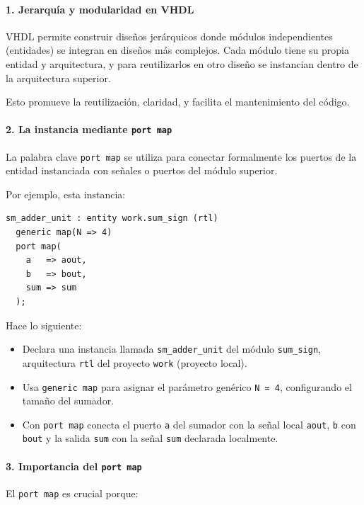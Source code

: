 \documentclass[a4paper,12pt]{article}
\begin{document}
\paragraph{1. Jerarquía y modularidad en VHDL}

VHDL permite construir diseños jerárquicos donde módulos independientes (entidades) se integran en diseños más complejos.  
Cada módulo tiene su propia entidad y arquitectura, y para reutilizarlos en otro diseño se instancian dentro de la arquitectura superior.  

Esto promueve la reutilización, claridad, y facilita el mantenimiento del código.

\paragraph{2. La instancia mediante \texttt{port map}}

La palabra clave \texttt{port map} se utiliza para conectar formalmente los puertos de la entidad instanciada con señales o puertos del módulo superior.

Por ejemplo, esta instancia:

\begin{lstlisting}[basicstyle=\ttfamily\footnotesize]
sm_adder_unit : entity work.sum_sign (rtl)
  generic map(N => 4)
  port map(
    a   => aout,
    b   => bout,
    sum => sum
  );
\end{lstlisting}

Hace lo siguiente:

\begin{itemize}
  \item Declara una instancia llamada \texttt{sm\_adder\_unit} del módulo \texttt{sum\_sign}, arquitectura \texttt{rtl} del proyecto \texttt{work} (proyecto local).  
  \item Usa \texttt{generic map} para asignar el parámetro genérico \texttt{N = 4}, configurando el tamaño del sumador.  
  \item Con \texttt{port map} conecta el puerto \texttt{a} del sumador con la señal local \texttt{aout}, \texttt{b} con \texttt{bout} y la salida \texttt{sum} con la señal \texttt{sum} declarada localmente.  
\end{itemize}

\paragraph{3. Importancia del \texttt{port map}}

El \texttt{port map} es crucial porque:
\end{document}
